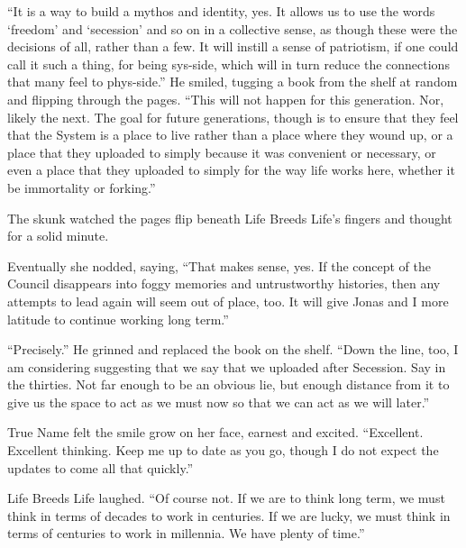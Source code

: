 ``It is a way to build a mythos and identity, yes. It allows us to use the words `freedom' and `secession' and so on in a collective sense, as though these were the decisions of all, rather than a few. It will instill a sense of patriotism, if one could call it such a thing, for being sys-side, which will in turn reduce the connections that many feel to phys-side.'' He smiled, tugging a book from the shelf at random and flipping through the pages. ``This will not happen for this generation. Nor, likely the next. The goal for future generations, though is to ensure that they feel that the System is a place to live rather than a place where they wound up, or a place that they uploaded to simply because it was convenient or necessary, or even a place that they uploaded to simply for the way life works here, whether it be immortality or forking.''

The skunk watched the pages flip beneath Life Breeds Life's fingers and thought for a solid minute.

Eventually she nodded, saying, ``That makes sense, yes. If the concept of the Council disappears into foggy memories and untrustworthy histories, then any attempts to lead again will seem out of place, too. It will give Jonas and I more latitude to continue working long term.''

``Precisely.'' He grinned and replaced the book on the shelf. ``Down the line, too, I am considering suggesting that we say that we uploaded after Secession. Say in the thirties. Not far enough to be an obvious lie, but enough distance from it to give us the space to act as we must now so that we can act as we will later.''

True Name felt the smile grow on her face, earnest and excited. ``Excellent. Excellent thinking. Keep me up to date as you go, though I do not expect the updates to come all that quickly.''

Life Breeds Life laughed. ``Of course not. If we are to think long term, we must think in terms of decades to work in centuries. If we are lucky, we must think in terms of centuries to work in millennia. We have plenty of time.''
